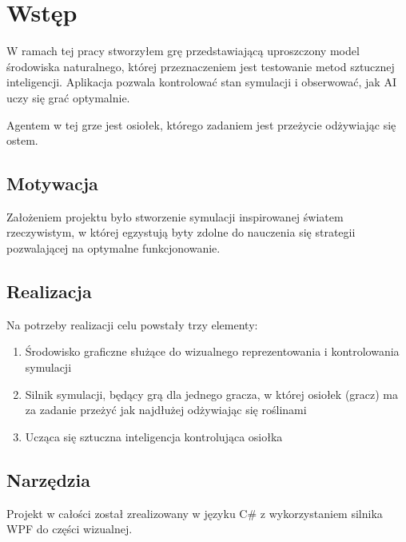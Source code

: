 \chapter{Wstęp}
W ramach tej pracy stworzyłem grę przedstawiającą uproszczony model środowiska naturalnego, której przeznaczeniem jest testowanie metod sztucznej inteligencji. Aplikacja pozwala kontrolować stan symulacji i obserwować, jak AI uczy się grać optymalnie.

Agentem w tej grze jest osiołek, którego zadaniem jest przeżycie odżywiając się ostem.

\section{Motywacja}
Założeniem projektu było stworzenie symulacji inspirowanej światem rzeczywistym, w której egzystują byty zdolne do nauczenia się strategii pozwalającej na optymalne funkcjonowanie. 


\section{Realizacja}
Na potrzeby realizacji celu powstały trzy elementy:

\begin{enumerate}
    \item Środowisko graficzne służące do wizualnego reprezentowania i kontrolowania symulacji
    \item Silnik symulacji, będący grą dla jednego gracza, w której osiołek (gracz) ma za zadanie przeżyć jak najdłużej odżywiając się roślinami
    \item Ucząca się sztuczna inteligencja kontrolująca osiołka
\end{enumerate}

\section{Narzędzia}
Projekt w całości został zrealizowany w języku C\# z wykorzystaniem silnika WPF do części wizualnej.



